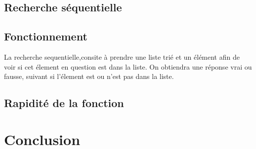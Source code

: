 \documentclass[a4paper, 12pt]{article}
\begin{document}
\subsection{Recherche séquentielle}

\subsection{Fonctionnement}
La recherche sequentielle,consite à prendre une liste trié et un élément afin de voir si cet élement en question est dans la liste. On obtiendra une réponse vrai ou fausse, suivant si l'élement est ou n'est pas dans la liste.
\subsection{Rapidité de la fonction}



\section{Conclusion}
\end{document}
